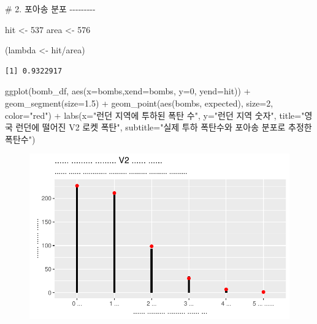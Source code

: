\documentclass[
  letterpaper,
  chapter,a4paper,showtrims,openright,hidelinks]{oblivoir}
\newenvironment{Shaded}{\begin{snugshade}}{\end{snugshade}}
\newcommand{\AttributeTok}[1]{\textcolor[rgb]{0.40,0.45,0.13}{#1}}
\newcommand{\CommentTok}[1]{\textcolor[rgb]{0.37,0.37,0.37}{#1}}
\newcommand{\DecValTok}[1]{\textcolor[rgb]{0.68,0.00,0.00}{#1}}
\newcommand{\FloatTok}[1]{\textcolor[rgb]{0.68,0.00,0.00}{#1}}
\newcommand{\FunctionTok}[1]{\textcolor[rgb]{0.28,0.35,0.67}{#1}}
\newcommand{\NormalTok}[1]{\textcolor[rgb]{0.00,0.23,0.31}{#1}}
\newcommand{\OtherTok}[1]{\textcolor[rgb]{0.00,0.23,0.31}{#1}}
\newcommand{\SpecialCharTok}[1]{\textcolor[rgb]{0.37,0.37,0.37}{#1}}
\newcommand{\StringTok}[1]{\textcolor[rgb]{0.13,0.47,0.30}{#1}}
\begin{document}
\begin{Shaded}
\begin{Highlighting}[]
\CommentTok{\# 2. 포아송 분포 {-}{-}{-}{-}{-}{-}{-}{-}{-} }

\NormalTok{hit }\OtherTok{\textless{}{-}} \DecValTok{537}
\NormalTok{area }\OtherTok{\textless{}{-}} \DecValTok{576}

\NormalTok{(lambda }\OtherTok{\textless{}{-}}\NormalTok{ hit}\SpecialCharTok{/}\NormalTok{area)}
\end{Highlighting}
\end{Shaded}

\begin{verbatim}
[1] 0.9322917
\end{verbatim}

\begin{Shaded}
\begin{Highlighting}[]
\FunctionTok{ggplot}\NormalTok{(bomb\_df, }\FunctionTok{aes}\NormalTok{(}\AttributeTok{x=}\NormalTok{bombs,}\AttributeTok{xend=}\NormalTok{bombs, }\AttributeTok{y=}\DecValTok{0}\NormalTok{, }\AttributeTok{yend=}\NormalTok{hit)) }\SpecialCharTok{+}
  \FunctionTok{geom\_segment}\NormalTok{(}\AttributeTok{size=}\FloatTok{1.5}\NormalTok{) }\SpecialCharTok{+}
  \FunctionTok{geom\_point}\NormalTok{(}\FunctionTok{aes}\NormalTok{(bombs, expected), }\AttributeTok{size=}\DecValTok{2}\NormalTok{, }\AttributeTok{color=}\StringTok{"red"}\NormalTok{) }\SpecialCharTok{+}
  \FunctionTok{labs}\NormalTok{(}\AttributeTok{x=}\StringTok{"런던 지역에 투하된 폭탄 수"}\NormalTok{, }\AttributeTok{y=}\StringTok{"런던 지역 숫자"}\NormalTok{, }\AttributeTok{title=}\StringTok{"영국 런던에 떨어진 V2 로켓 폭탄"}\NormalTok{,}
       \AttributeTok{subtitle=}\StringTok{"실제 투하 폭탄수와 포아송 분포로 추정한 폭탄수"}\NormalTok{)}
\end{Highlighting}
\end{Shaded}

\begin{figure}[H]

{\centering \includegraphics{cs_prussia_files/figure-pdf/v2-viz-1.pdf}

}

\end{figure}
\end{document}
